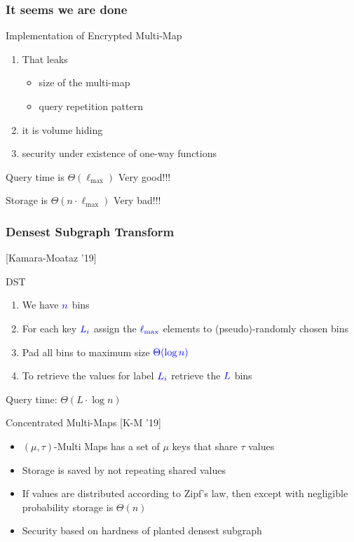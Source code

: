 \documentclass[]{beamer}
\newcommand{\LMax}{\ell_{\text{max}}}
\begin{document}
{\begin{frame}
\frametitle{It seems we are done}
\begin{block}{Implementation of Encrypted Multi-Map}
\begin{enumerate}
\item That leaks
\begin{itemize}
\item size of the multi-map
\item query repetition pattern
\end{itemize}
\item it is volume hiding
\item security under existence of one-way functions
\end{enumerate}
\end{block}
\pause
\vskip 1.5cm
\alert{Query time is $\Theta(\LMax)$} \hfill {\color{olive} Very good!!!}
\pause

\vskip 1cm
\alert{Storage is $\Theta(n\cdot\LMax)$} \pause
\hfill {\color{olive} Very bad!!!}
\end{frame}

\begin{frame}
\frametitle{Densest Subgraph Transform}
    \hfill {[Kamara-Moataz '19]}

\begin{block}{DST}
\begin{enumerate}
\item We have $\color{blue} n$ bins
\item For each key $\color{blue} L_i$ assign the $\color{blue}\LMax$ 
elements to (pseudo)-randomly chosen bins
\item Pad all bins to maximum size $\color{blue} \Theta(\log n)$
\item To retrieve the values for label $\color{blue} L_i$ retrieve the 
$\color{blue} L$ bins 
\end{enumerate}

{\color{brown}
Query time: $\Theta(L\cdot \log n)$}
\end{block}
\end{frame}

\begin{frame}

\begin{block}{Concentrated Multi-Maps [K-M '19]}
    \begin{itemize}[<+->]
\item 
$(\mu,\tau)$-Multi Maps has a set of $\mu$ keys that share $\tau$ values
\item 
Storage is saved by not repeating shared values 
\item If values are distributed according to {\color{brown} Zipf's law}, then 
except with negligible probability storage is $\Theta(n)$
\item Security based on hardness of planted densest subgraph
\end{itemize}
\end{block}



\end{frame}}
\end{document}
